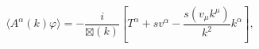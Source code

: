 \begin{equation}
\langle A^{\alpha}\left(  k\right)  \varphi\rangle=-\frac{i}{\boxtimes
(k)}\left[  T^{\alpha}+sv^{\alpha}-\frac{s\left(  v_{\mu}k^{\mu}\right)
}{k^{2}}k^{\alpha}\right]  ,
\end{equation}

